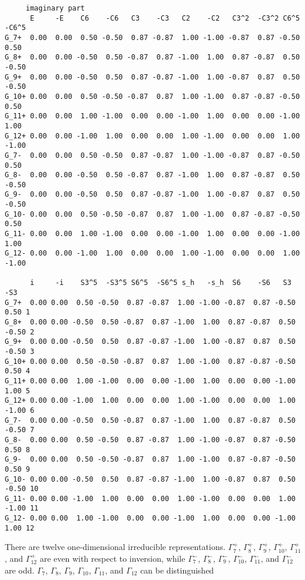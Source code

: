 \documentclass[12pt,a4paper]{article}
\begin{document}
\begin{footnotesize}
\begin{verbatim}
     imaginary part
      E     -E    C6    -C6   C3    -C3   C2    -C2   C3^2  -C3^2 C6^5  -C6^5
G_7+  0.00  0.00  0.50 -0.50  0.87 -0.87  1.00 -1.00 -0.87  0.87 -0.50  0.50
G_8+  0.00  0.00 -0.50  0.50 -0.87  0.87 -1.00  1.00  0.87 -0.87  0.50 -0.50
G_9+  0.00  0.00 -0.50  0.50  0.87 -0.87 -1.00  1.00 -0.87  0.87  0.50 -0.50
G_10+ 0.00  0.00  0.50 -0.50 -0.87  0.87  1.00 -1.00  0.87 -0.87 -0.50  0.50
G_11+ 0.00  0.00  1.00 -1.00  0.00  0.00 -1.00  1.00  0.00  0.00 -1.00  1.00
G_12+ 0.00  0.00 -1.00  1.00  0.00  0.00  1.00 -1.00  0.00  0.00  1.00 -1.00
G_7-  0.00  0.00  0.50 -0.50  0.87 -0.87  1.00 -1.00 -0.87  0.87 -0.50  0.50
G_8-  0.00  0.00 -0.50  0.50 -0.87  0.87 -1.00  1.00  0.87 -0.87  0.50 -0.50
G_9-  0.00  0.00 -0.50  0.50  0.87 -0.87 -1.00  1.00 -0.87  0.87  0.50 -0.50
G_10- 0.00  0.00  0.50 -0.50 -0.87  0.87  1.00 -1.00  0.87 -0.87 -0.50  0.50
G_11- 0.00  0.00  1.00 -1.00  0.00  0.00 -1.00  1.00  0.00  0.00 -1.00  1.00
G_12- 0.00  0.00 -1.00  1.00  0.00  0.00  1.00 -1.00  0.00  0.00  1.00 -1.00

      i     -i    S3^5  -S3^5 S6^5  -S6^5 s_h   -s_h  S6    -S6   S3    -S3
G_7+  0.00 0.00  0.50 -0.50  0.87 -0.87  1.00 -1.00 -0.87  0.87 -0.50  0.50 1
G_8+  0.00 0.00 -0.50  0.50 -0.87  0.87 -1.00  1.00  0.87 -0.87  0.50 -0.50 2
G_9+  0.00 0.00 -0.50  0.50  0.87 -0.87 -1.00  1.00 -0.87  0.87  0.50 -0.50 3
G_10+ 0.00 0.00  0.50 -0.50 -0.87  0.87  1.00 -1.00  0.87 -0.87 -0.50  0.50 4
G_11+ 0.00 0.00  1.00 -1.00  0.00  0.00 -1.00  1.00  0.00  0.00 -1.00  1.00 5
G_12+ 0.00 0.00 -1.00  1.00  0.00  0.00  1.00 -1.00  0.00  0.00  1.00 -1.00 6
G_7-  0.00 0.00 -0.50  0.50 -0.87  0.87 -1.00  1.00  0.87 -0.87  0.50 -0.50 7
G_8-  0.00 0.00  0.50 -0.50  0.87 -0.87  1.00 -1.00 -0.87  0.87 -0.50  0.50 8
G_9-  0.00 0.00  0.50 -0.50 -0.87  0.87  1.00 -1.00  0.87 -0.87 -0.50  0.50 9
G_10- 0.00 0.00 -0.50  0.50  0.87 -0.87 -1.00  1.00 -0.87  0.87  0.50 -0.50 10
G_11- 0.00 0.00 -1.00  1.00  0.00  0.00  1.00 -1.00  0.00  0.00  1.00 -1.00 11
G_12- 0.00 0.00  1.00 -1.00  0.00  0.00 -1.00  1.00  0.00  0.00 -1.00  1.00 12
\end{verbatim} 
\end{footnotesize}
There are twelve one-dimensional irreducible representations. 
$\Gamma_7^+$, $\Gamma_8^+$, $\Gamma_9^+$, $\Gamma_{10}^+$, $\Gamma_{11}^+$,
and $\Gamma_{12}^+$ are even with respect to inversion, while 
$\Gamma_7^-$, $\Gamma_8^-$, $\Gamma_9^-$, $\Gamma_{10}^-$, $\Gamma_{11}^-$,
and $\Gamma_{12}^-$ are odd. $\Gamma_7$, $\Gamma_8$, $\Gamma_9$, 
$\Gamma_{10}$, $\Gamma_{11}$, and $\Gamma_{12}$ can be distinguished
\end{document}
